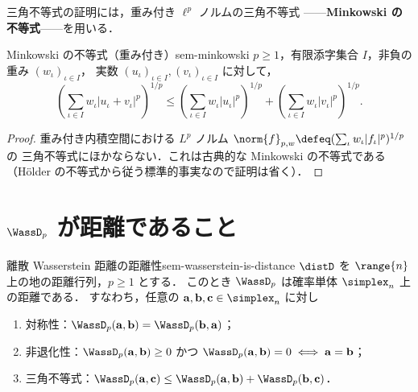 三角不等式の証明には，重み付き $\ell^p$ ノルムの三角不等式
——\textbf{Minkowski の不等式}——を用いる．

\begin{claim}{Minkowski の不等式（重み付き）}{sem-minkowski}
  $p \geq 1$，有限添字集合 $I$，非負の重み $(w_\iota)_{\iota \in I}$，
  実数 $(u_\iota)_{\iota \in I}, (v_\iota)_{\iota \in I}$ に対して，
  \[
    \left(
      \sum_{\iota \in I} w_\iota |u_\iota + v_\iota|^p
    \right)^{1/p}
    \leq
    \left(
      \sum_{\iota \in I} w_\iota |u_\iota|^p
    \right)^{1/p}
    +
    \left(
      \sum_{\iota \in I} w_\iota |v_\iota|^p
    \right)^{1/p}.
  \]
\end{claim}

\begin{proof}
  重み付き内積空間における $L^p$ ノルム
  $\norm{f}_{p,w} \defeq (\sum_\iota w_\iota |f_\iota|^p)^{1/p}$ の
  三角不等式にほかならない．これは古典的な Minkowski の不等式である
  （Hölder の不等式から従う標準的事実なので証明は省く）．
\end{proof}

\section{\texorpdfstring{$\WassD_p$}{Wp} が距離であること}
\label{sec:sem-wasserstein-distance-discrete}

\begin{theorem}{離散 Wasserstein 距離の距離性}{sem-wasserstein-is-distance}
  $\distD$ を $\range{n}$ 上の地の距離行列，$p \geq 1$ とする．
  このとき $\WassD_p$ は確率単体 $\simplex_n$ 上の距離である．
  すなわち，任意の $\mathbf{a}, \mathbf{b}, \mathbf{c} \in \simplex_n$ に対し
  \begin{enumerate}
    \item[\textrm{(i)}] 対称性：$\WassD_p(\mathbf{a}, \mathbf{b})
      = \WassD_p(\mathbf{b}, \mathbf{a})$；
    \item[\textrm{(ii)}] 非退化性：$\WassD_p(\mathbf{a}, \mathbf{b}) \geq 0$ かつ
      $\WassD_p(\mathbf{a}, \mathbf{b}) = 0 \iff \mathbf{a} = \mathbf{b}$；
    \item[\textrm{(iii)}] 三角不等式：$\WassD_p(\mathbf{a}, \mathbf{c})
      \leq \WassD_p(\mathbf{a}, \mathbf{b}) + \WassD_p(\mathbf{b}, \mathbf{c})$．
  \end{enumerate}
\end{theorem}

